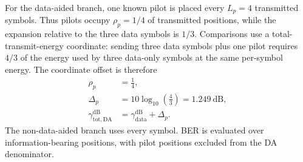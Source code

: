 For the data-aided branch, one known pilot is placed every \(L_p=4\) transmitted symbols. Thus pilots occupy \(\rho_p=1/4\) of transmitted positions, while the expansion relative to the three data symbols is \(1/3\). Comparisons use a total-transmit-energy coordinate: sending three data symbols plus one pilot requires \(4/3\) of the energy used by three data-only symbols at the same per-symbol energy. The coordinate offset is therefore
\begin{equation}
  \begin{aligned}
  \rho_p&=\frac{1}{4},\\
  \Delta_p&=10\log_{10}\!\left(\frac{4}{3}\right)=1.249~\mathrm{dB},\\
  \gamma_{\mathrm{tot,DA}}^{\mathrm{dB}}
    &=\gamma_{\mathrm{data}}^{\mathrm{dB}}+\Delta_p.
  \end{aligned}
  \label{eq:pilot-energy-coordinate}
\end{equation}
The non-data-aided branch uses every symbol. BER is evaluated over information-bearing positions, with pilot positions excluded from the DA denominator.
